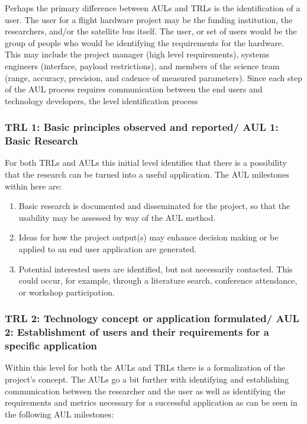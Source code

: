 \documentclass[referee,a4paper,12pt,traditabstract]{swsc}
\begin{document}
\begin{linenumbers}
Perhaps the primary difference between AULs and TRLs is the identification of a user. The user for a flight hardware project may be the funding institution, the researchers, and/or the satellite bus itself. The user, or set of users would be the group of people who would be identifying the requirements for the hardware. This may include the project manager (high level requirements), systems engineers (interface, payload restrictions), and members of the science team (range, accuracy, precision, and cadence of measured parameters).
Since each step of the AUL process requires communication between the end users and technology developers, the level identification process 

\subsubsection{TRL 1: Basic principles observed and reported/ AUL 1: Basic Research}
For both TRLs and AULs this initial level identifies that there is a possibility that the research can be turned into a useful application. The AUL milestones within here are: \\

\renewcommand{\labelenumi}{\alph{enumi})}
\begin{enumerate}
\item  Basic research is documented and disseminated for the project, so that the usability may be assessed by way of the AUL method. 
\item  Ideas for how the project output(s) may enhance decision making or be applied to an end user application are generated.
\item  Potential interested users are identified, but not necessarily contacted.  This could occur, for example, through a literature search, conference attendance, or workshop participation.
\end{enumerate}

\subsubsection{TRL 2: Technology concept or application formulated/ AUL 2: Establishment of users and their requirements for a specific application}
Within this level for both the AULs and TRLs there is a formalization of the project's concept. The AULs go a bit further with identifying and establishing communication between the researcher and the user as well as identifying the requirements and metrics necessary for a successful application as can be seen in the following AUL milestones: \\


\end{linenumbers}
\end{document}
